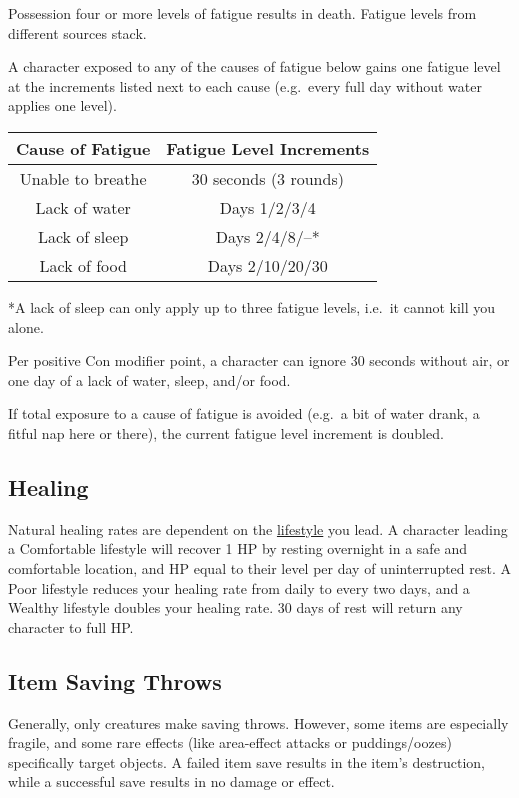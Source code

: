 \documentclass{article}
\begin{document}
\begin{multicols}{2}
Possession four or more levels of fatigue results in death. Fatigue
levels from different sources stack.

A character exposed to any of the causes of fatigue below gains one
fatigue level at the increments listed next to each cause (e.g.~every
full day without water applies one level).

\begin{longtable}[]{@{}cc@{}}
\toprule\noalign{}
Cause of Fatigue & Fatigue Level Increments \\
\midrule\noalign{}
\endhead
\bottomrule\noalign{}
\endlastfoot
Unable to breathe & 30 seconds (3 rounds) \\
Lack of water & Days 1/2/3/4 \\
Lack of sleep & Days 2/4/8/--* \\
Lack of food & Days 2/10/20/30 \\
\end{longtable}

*A lack of sleep can only apply up to three fatigue levels, i.e.~it
cannot kill you alone.

Per positive Con modifier point, a character can ignore 30 seconds
without air, or one day of a lack of water, sleep, and/or food.

If total exposure to a cause of fatigue is avoided (e.g.~a bit of water
drank, a fitful nap here or there), the current fatigue level increment
is doubled.

\subsection{Healing}\label{healing}

Natural healing rates are dependent on the
\hyperref[upkeep-lifestyle]{lifestyle} you lead. A character leading a
Comfortable lifestyle will recover 1 HP by resting overnight in a safe
and comfortable location, and HP equal to their level per day of
uninterrupted rest. A Poor lifestyle reduces your healing rate from
daily to every two days, and a Wealthy lifestyle doubles your healing
rate. 30 days of rest will return any character to full HP.

\subsection{Item Saving Throws}\label{item-saving-throws}

Generally, only creatures make saving throws. However, some items are
especially fragile, and some rare effects (like area-effect attacks or
puddings/oozes) specifically target objects. A failed item save results
in the item's destruction, while a successful save results in no damage
or effect.


\end{multicols}
\end{document}
